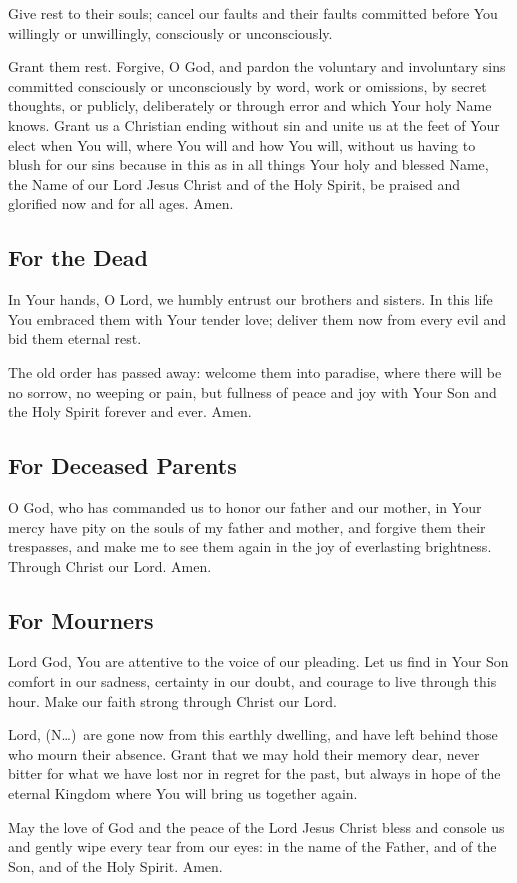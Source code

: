 \documentclass[12pt]{article}
\newcommand{\prayertitle}[1]{\subsection{#1}}
\newcommand{\insertname}{(N\dots)}
\begin{document}
Give rest to their souls;
cancel our faults and their faults committed before You willingly or unwillingly, consciously or unconsciously.

Grant them rest.
Forgive, O God, and pardon the voluntary and involuntary sins committed consciously or unconsciously by word, work or omissions, by secret thoughts, or publicly, deliberately or through error and which Your holy Name knows.
Grant us a Christian ending without sin and unite us at the feet of Your elect when You will, where You will and how You will, without us having to blush for our sins because in this as in all things Your holy and blessed Name, the Name of our Lord Jesus Christ and of the Holy Spirit, be praised and glorified now and for all ages. Amen.

\prayertitle{For the Dead}
In Your hands, O Lord, we humbly entrust our brothers and sisters.
In this life You embraced them with Your tender love;
deliver them now from every evil and bid them eternal rest.

The old order has passed away:
welcome them into paradise, where there will be no sorrow, no weeping or pain,
but fullness of peace and joy with Your Son and the Holy Spirit forever and ever.
Amen.

\prayertitle{For Deceased Parents}
O God, who has commanded us to honor our father and our mother, in Your mercy have pity on the souls of my father and mother, and forgive them their trespasses, and make me to see them again in the joy of everlasting brightness. Through Christ our Lord. Amen.

\prayertitle{For Mourners}
Lord God, You are attentive to the voice of our pleading.
Let us find in Your Son comfort in our sadness, certainty in our doubt, and courage to live through this hour.
Make our faith strong through Christ our Lord.

Lord, \insertname\ are gone now from this earthly dwelling, and have left behind those who mourn their absence.
Grant that we may hold their memory dear, never bitter for what we have lost
nor in regret for the past, but always in hope of the eternal Kingdom where You will bring us together again.

May the love of God and the peace of the Lord Jesus Christ bless and console us and gently wipe every tear from our eyes:
in the name of the Father, and of the Son, and of the Holy Spirit.
Amen.
\end{document}
